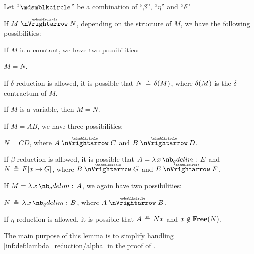 \begin{lemma}\label{thm:parallel_reduction_deconstruction}
  Let \enquote{\( {\Anon} \)} be a combination of \enquote{\( \beta \)}, \enquote{\( \eta \)} and \enquote{\( \delta \)}.

  If \( M \ppred N \), depending on the structure of \( M \), we have the following possibilities:
  \begin{thmenum}
     If \( M \) is a constant, we have two possibilities:
    \begin{thmenum}
       \( M = N \).

       If \( \delta \)-reduction is allowed, it is possible that \( N \aequiv \op*{\delta}(M) \), where \( \op*{\delta}(M) \) is the \( \delta \)-contractum  of \( M \).
    \end{thmenum}

     If \( M \) is a variable, then \( M = N \).

     If \( M = AB \), we have three possibilities:
    \begin{thmenum}
       \( N = CD \), where \( A \ppred C \) and \( B \ppred D \).

       If \( \beta \)-reduction is allowed, it is possible that \( A = \qabs x E \) and \( N \aequiv F[x \mapsto G] \), where \( B \ppred G \) and \( E \ppred F \).
    \end{thmenum}

     If \( M = \qabs x A \), we again have two possibilities:
    \begin{thmenum}
       \( N \aequiv \qabs x B \), where \( A \ppred B \).

       If \( \eta \)-reduction is allowed, it is possible that \( A \aequiv Nx \) and \( x \not\in \op*{Free}(N) \).
    \end{thmenum}
  \end{thmenum}
\end{lemma}
\begin{comments}
  \item The main purpose of this lemma is to simplify handling \ref{inf:def:lambda_reduction/alpha} in the proof of .
\end{comments}
